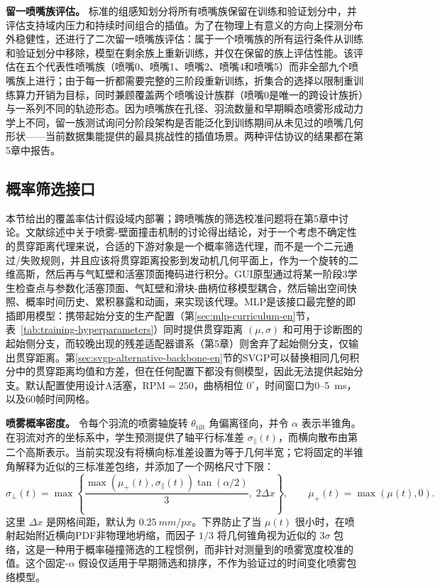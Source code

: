 \textbf{留一喷嘴族评估。} 标准的组感知划分将所有喷嘴族保留在训练和验证划分中，并评估支持域内压力和持续时间组合的插值。为了在物理上有意义的方向上探测分布外稳健性，还进行了二次留一喷嘴族评估：属于一个喷嘴族的所有运行条件从训练和验证划分中移除，模型在剩余族上重新训练，并仅在保留的族上评估性能。该评估在五个代表性喷嘴族（喷嘴0、喷嘴1、喷嘴2、喷嘴4和喷嘴5）而非全部九个喷嘴族上进行；由于每一折都需要完整的三阶段重新训练，折集合的选择以限制重训练算力开销为目标，同时兼顾覆盖两个喷嘴设计族群（喷嘴0是唯一的跨设计族折）与一系列不同的轨迹形态。因为喷嘴族在孔径、羽流数量和早期瞬态喷雾形成动力学上不同，留一族测试询问分阶段架构是否能泛化到训练期间从未见过的喷嘴几何形状——当前数据集能提供的最具挑战性的插值场景。两种评估协议的结果都在第5章中报告。

\subsection{概率筛选接口}
\label{sec:screening-interface-en}

本节给出的覆盖率估计假设域内部署；跨喷嘴族的筛选校准问题将在第5章中讨论。文献综述中关于喷雾-壁面撞击机制的讨论得出结论，对于一个考虑不确定性的贯穿距离代理来说，合适的下游对象是一个概率筛选代理，而不是一个二元通过/失败规则，并且应该将贯穿距离投影到发动机几何平面上，作为一个旋转的二维高斯，然后再与气缸壁和活塞顶面掩码进行积分。GUI原型通过将某一阶段3学生检查点与参数化活塞顶面、气缸壁和滑块-曲柄位移模型耦合，然后输出空间快照、概率时间历史、累积暴露和动画，来实现该代理。MLP是该接口最完整的即插即用模型：携带起始分支的生产配置（第\ref{sec:mlp-curriculum-en}节，表~\ref{tab:training-hyperparameters}）同时提供贯穿距离 \((\mu,\sigma)\) 和可用于诊断图的起始侧分支，而较晚出现的残差适配器谱系（第5章）则舍弃了起始侧分支，仅输出贯穿距离。第\ref{sec:svgp-alternative-backbone-en}节的SVGP可以替换相同几何积分中的贯穿距离均值和方差，但在任何配置下都没有侧模型，因此无法提供起始分支。默认配置使用设计A活塞，\(\mathrm{RPM}=250\)，曲柄相位 \(0^{\circ}\)，时间窗口为0--\SI{5}{ms}，以及60帧时间网格。

\textbf{喷雾概率密度。} 令每个羽流的喷雾轴旋转 $\theta_{\mathrm{tilt}}$ 角偏离径向，并令 $\alpha$ 表示半锥角。在羽流对齐的坐标系中，学生预测提供了轴平行标准差 $\sigma_{\parallel}(t)$，而横向散布由第二个高斯表示。当前实现没有将横向标准差设置为等于几何半宽；它将固定的半锥角解释为近似的三标准差包络，并添加了一个网格尺寸下限：
\[
\sigma_{\perp}(t)
=\max\!\left\{
\frac{\max\!\left(\mu_{+}(t),\sigma_{\parallel}(t)\right)\tan(\alpha/2)}{3},
\;2\Delta x
\right\},\qquad
\mu_{+}(t)=\max(\mu(t),0).
\]
这里 $\Delta x$ 是网格间距，默认为 \(\SI{0.25}{mm/px}\)。下界防止了当 \(\mu(t)\) 很小时，在喷射起始附近横向PDF非物理地坍缩，而因子 \(1/3\) 将几何锥角视为近似的 \(3\sigma\) 包络，这是一种用于概率碰撞筛选的工程惯例，而非针对测量到的喷雾宽度校准的值。这个固定-\(\alpha\) 假设仅适用于早期筛选和排序，不作为验证过的时间变化喷雾包络模型。

